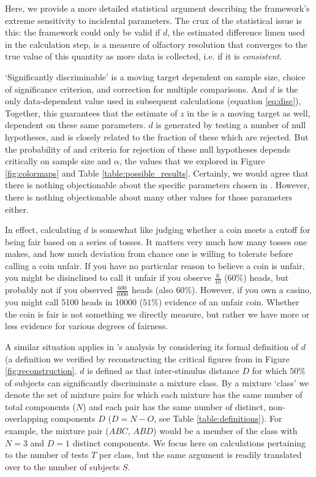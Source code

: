 \documentclass[letterpaper,twocolumn,10pt]{article}
\begin{document}
Here, we provide a more detailed statistical argument describing the framework's extreme sensitivity to incidental parameters. 
The crux of the statistical issue is this: 
the framework could only be valid if $d$, the estimated difference limen used in the calculation step, 
is a measure of olfactory resolution that converges to the true value of this quantity as more data is collected, 
i.e. if it is \emph{consistent}. 

`Significantly discriminable' is a moving target dependent on sample size, 
choice of significance criterion, and correction for multiple comparisons. And
 $d$ is the only data-dependent value used in subsequent calculations (equation \ref{eq:disc}), 
Together, this guarantees that the estimate of $z$ in the \cite{bushdid_humans_2014} is a moving target as well, 
dependent on these same parameters.
$d$ is generated by testing a number of null hypotheses, 
and is closely related to the fraction of these which are rejected.  
But the probability of and criteria for rejection of these null hypotheses depends critically on sample size and $\alpha$, the values
that we explored in Figure \ref{fig:colormaps} and Table \ref{table:possible_results}. 
Certainly, we would agree that there is nothing objectionable about the specific parameters chosen in \cite{bushdid_humans_2014}. 
However, there is nothing objectionable about many other values for those parameters either. 

In effect, calculating $d$ is somewhat like judging whether a coin meets a cutoff for being fair based on a series of tosses. 
It matters very much how many tosses one makes, 
and how much deviation from chance one is willing to tolerate before calling a coin unfair. 
If you have no particular reason to believe a coin is unfair, 
you might be disinclined to call it unfair if you observe $\frac{6}{10}$ ($60\%$) heads, 
but probably not if you observed $\frac{600}{1000}$ heads 
(also $60\%$). 
However, if you own a casino, you might call 5100 heads in 10000 ($51\%$) evidence of an unfair coin. 
Whether the coin is fair is not something we directly measure, 
but rather we have more or less evidence for various degrees of fairness.  

A similar situation applies in \cite{bushdid_humans_2014}'s analysis by considering its formal definition of $d$ 
(a definition we verified by reconstructing the critical figures from \cite{bushdid_humans_2014} in Figure \ref{fig:reconstruction}. 
$d$ is defined as that inter-stimulus distance $D$ for which $50\%$ of subjects can significantly discriminate a mixture class. 
By a mixture `class' we denote the set of mixture pairs for which each mixture has the same number of total components ($N$) 
and each pair has the same number of distinct, non-overlapping components $D$ ($D=N-O$, see Table \ref{table:definitions}). 
For example, the mixture pair ($ABC$, $ABD$) would be a member of the class with $N=3$ and $D=1$ distinct components. 
We focus here on calculations pertaining to the number of tests $T$ per class, 
but the same argument is readily translated over to the number of subjects $S$.
\end{document}
